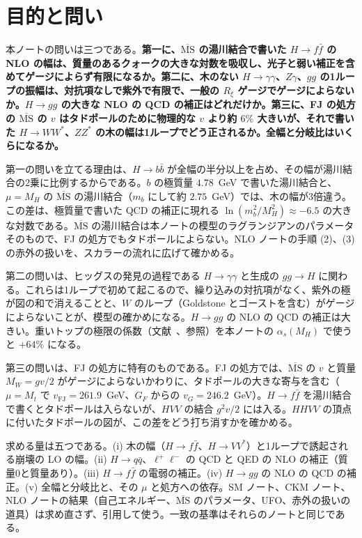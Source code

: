 \documentclass[a4paper,10pt]{ltjsarticle}
\newcommand{\MSbar}{\overline{\mathrm{MS}}}
\begin{document}
\tableofcontents

\section{目的と問い}\label{sec:intro}

本ノートの問いは三つである。\textbf{第一に、$\MSbar$ の湯川結合で書いた $H\to f\bar f$ の NLO の幅は、質量のあるクォークの大きな対数を吸収し、光子と弱い補正を含めてゲージによらず有限になるか。第二に、木のない $H\to\gamma\gamma$、$Z\gamma$、$gg$ の1ループの振幅は、対抗項なしで紫外で有限で、一般の $R_\xi$ ゲージでゲージによらないか。$H\to gg$ の大きな NLO の QCD の補正はどれだけか。第三に、FJ の処方の $\MSbar$ の $v$ はタドポールのために物理的な $v$ より約 $6\%$ 大きいが、それで書いた $H\to WW^*$、$ZZ^*$ の木の幅は1ループでどう正されるか。全幅と分岐比はいくらになるか。}

第一の問いを立てる理由は、$H\to b\bar b$ が全幅の半分以上を占め、その幅が湯川結合の2乗に比例するからである。$b$ の極質量 $4.78$~GeV で書いた湯川結合と、$\mu=M_H$ の $\MSbar$ の湯川結合（$m_b$ にして約 $2.75$~GeV）では、木の幅が3倍違う。この差は、極質量で書いた QCD の補正に現れる $\ln(m_b^2/M_H^2)\approx-6.5$ の大きな対数である。$\MSbar$ の湯川結合は本ノートの模型のラグランジアンのパラメータそのもので、FJ の処方でもタドポールによらない。NLO ノートの手順 (2)、(3) の赤外の扱いを、スカラーの流れに広げて確かめる。

第二の問いは、ヒッグスの発見の過程である $H\to\gamma\gamma$ と生成の $gg\to H$ に関わる。これらは1ループで初めて起こるので、繰り込みの対抗項がなく、紫外の極が図の和で消えることと、$W$ のループ（Goldstone とゴーストを含む）がゲージによらないことが、模型の確かめになる。$H\to gg$ の NLO の QCD の補正は大きい。重いトップの極限の係数（文献~\cite{spira95}、参照）を本ノートの $\alpha_s(M_H)$ で使うと $+64\%$ になる。

第三の問いは、FJ の処方に特有のものである。FJ の処方では、$\MSbar$ の $v$ と質量 $M_W=gv/2$ がゲージによらないかわりに、タドポールの大きな寄与を含む（$\mu=M_t$ で $v_{\mathrm{FJ}}=261.9$~GeV、$G_F$ からの $v_G=246.2$~GeV）。$H\to f\bar f$ を湯川結合で書くとタドポールは入らないが、$HVV$ の結合 $g^2v/2$ には入る。$HHVV$ の頂点に付いたタドポールの図が、この差をどう打ち消すかを確かめる。

求める量は五つである。(i) 木の幅（$H\to f\bar f$、$H\to VV^*$）と1ループで誘起される崩壊の LO の幅。(ii) $H\to q\bar q$、$\ell^+\ell^-$ の QCD と QED の NLO の補正（質量0と質量あり）。(iii) $H\to f\bar f$ の電弱の補正。(iv) $H\to gg$ の NLO の QCD の補正。(v) 全幅と分岐比と、その $\mu$ と処方への依存。SM ノート、CKM ノート、NLO ノートの結果（自己エネルギー、$\MSbar$ のパラメータ、UFO、赤外の扱いの道具）は求め直さず、引用して使う。一致の基準はそれらのノートと同じである。
\end{document}

